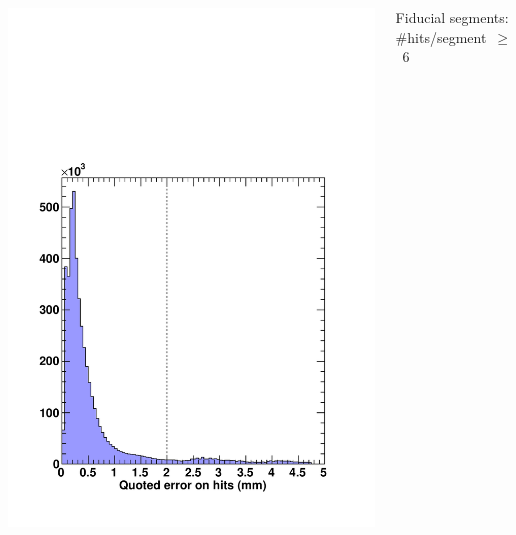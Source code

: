 \documentclass[compress]{beamer}
\begin{document}
\begin{frame}
\begin{columns}
\includegraphics[width=\linewidth]{MCBeamHalo_hit_error.pdf}

Fiducial segments: \\ \mbox{\#hits/segment $\ge$ 6} \\ \mbox{ }


\end{columns}
\end{frame}
\end{document}
